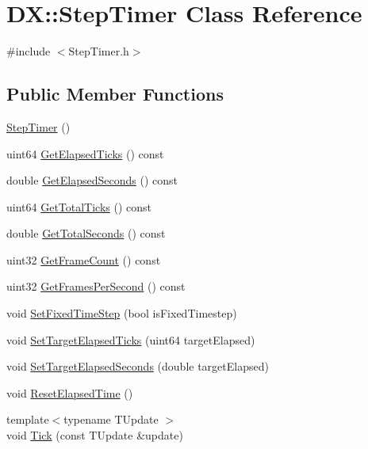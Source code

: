 \hypertarget{class_d_x_1_1_step_timer}{}\section{DX\+:\+:Step\+Timer Class Reference}
\label{class_d_x_1_1_step_timer}


{\ttfamily \#include $<$Step\+Timer.\+h$>$}

\subsection*{Public Member Functions}
\begin{DoxyCompactItemize}
\item 
\hyperlink{class_d_x_1_1_step_timer_ae331f005f44c4e057c4bc7f96fe08f49}{Step\+Timer} ()
\item 
uint64 \hyperlink{class_d_x_1_1_step_timer_a311e3f7a1c0f1d8697f5aa68cadbc2f1}{Get\+Elapsed\+Ticks} () const
\item 
double \hyperlink{class_d_x_1_1_step_timer_a979be5067a77c50e31933ec12ca9b61b}{Get\+Elapsed\+Seconds} () const
\item 
uint64 \hyperlink{class_d_x_1_1_step_timer_a499065f09fb33708a1bc0c209d2f4792}{Get\+Total\+Ticks} () const
\item 
double \hyperlink{class_d_x_1_1_step_timer_a2c052574806156bdd31e88a31ef5f10f}{Get\+Total\+Seconds} () const
\item 
uint32 \hyperlink{class_d_x_1_1_step_timer_a0d20e64dea2ffd6cbe18fe84a62e7d44}{Get\+Frame\+Count} () const
\item 
uint32 \hyperlink{class_d_x_1_1_step_timer_a20dd186f3f67a26515bffca9081ff1dc}{Get\+Frames\+Per\+Second} () const
\item 
void \hyperlink{class_d_x_1_1_step_timer_ab108c5203686e605af494a4ebe39cb56}{Set\+Fixed\+Time\+Step} (bool is\+Fixed\+Timestep)
\item 
void \hyperlink{class_d_x_1_1_step_timer_ae026efbd3f030937bd5bd2d0326d825e}{Set\+Target\+Elapsed\+Ticks} (uint64 target\+Elapsed)
\item 
void \hyperlink{class_d_x_1_1_step_timer_a7487a7841823805904a548e3fa37cef2}{Set\+Target\+Elapsed\+Seconds} (double target\+Elapsed)
\item 
void \hyperlink{class_d_x_1_1_step_timer_ab07d4b15dec4b2ef390a359aeaad24fd}{Reset\+Elapsed\+Time} ()
\item 
{\footnotesize template$<$typename T\+Update $>$ }\\void \hyperlink{class_d_x_1_1_step_timer_a758b88f80e00fabee7167885476681ee}{Tick} (const T\+Update \&update)
\end{DoxyCompactItemize}
